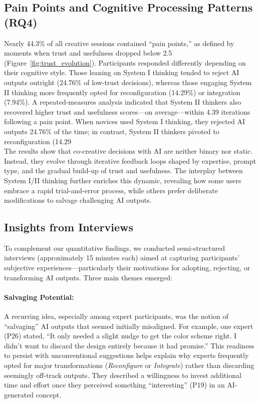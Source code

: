 \documentclass[letterpaper]{article} %
\begin{document}
\subsection{Pain Points and Cognitive Processing Patterns (RQ4)}
Nearly 44.3\% of all creative sessions contained “pain points,” as defined by moments when trust and usefulness dropped below 2.5 (Figure~\ref{fig:trust_evolution}). Participants responded differently depending on their cognitive style. Those leaning on System I thinking tended to reject AI outputs outright (24.76\% of low-trust decisions), whereas those engaging System II thinking more frequently opted for reconfiguration (14.29\%) or integration (7.94\%). A repeated-measures analysis indicated that System II thinkers also recovered higher trust and usefulness scores—on average—within 4.39 iterations following a pain point. When novices used System I thinking, they rejected AI outputs 24.76\% of the time; in contrast, System II thinkers pivoted to reconfiguration (14.29\\%

The results show that co-creative decisions with AI are neither binary nor static. Instead, they evolve through iterative feedback loops shaped by expertise, prompt type, and the gradual build-up of trust and usefulness. The interplay between System I/II thinking further enriches this dynamic, revealing how some users embrace a rapid trial-and-error process, while others prefer deliberate modifications to salvage challenging AI outputs.

\subsection{Insights from Interviews}
To complement our quantitative findings, we conducted semi-structured interviews (approximately 15 minutes each) aimed at capturing participants’ subjective experiences—particularly their motivations for adopting, rejecting, or transforming AI outputs. Three main themes emerged:

\paragraph{Salvaging Potential:} A recurring idea, especially among expert participants, was the notion of “salvaging” AI outputs that seemed initially misaligned. For example, one expert (P26) stated, “It only needed a slight nudge to get the color scheme right. I didn’t want to discard the design entirely because it had promise.” This readiness to persist with unconventional suggestions helps explain why experts frequently opted for major transformations (\textit{Reconfigure} or \textit{Integrate}) rather than discarding seemingly off-track outputs. They described a willingness to invest additional time and effort once they perceived something “interesting” (P19) in an AI-generated concept.
\end{document}
